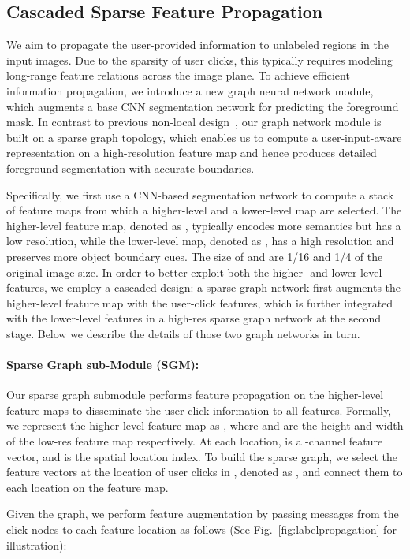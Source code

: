 \documentclass{bmvc2k}
\begin{document}
\subsection{Cascaded Sparse Feature Propagation}\label{prop}
We aim to propagate the user-provided information to unlabeled regions in the input images. Due to the sparsity of user clicks, this typically requires modeling long-range feature relations across the image plane. To achieve efficient information propagation, we introduce a new graph neural network module, which augments a base CNN segmentation network for predicting the foreground mask. In contrast to previous non-local design~\cite{wang2018non,chen2021conditional}, our graph network module is built on a sparse graph topology, which enables us to compute a user-input-aware representation on a high-resolution feature map and hence produces detailed foreground segmentation with accurate boundaries.   


Specifically, we first use a CNN-based segmentation network to compute a stack of feature maps from which a higher-level and a lower-level map are selected. The higher-level feature map, denoted as , typically encodes more semantics but has a low resolution, while the lower-level map, denoted as , has a high resolution and preserves more object boundary cues. The size of  and  are 1/16 and 1/4 of the original image size. 
In order to better exploit both the higher- and lower-level features, we employ a cascaded design: a sparse graph network first augments the higher-level feature map with the user-click features, which is further integrated with the lower-level features in a high-res sparse graph network at the second stage. 
Below we describe the details of those two graph networks in turn.  

\paragraph{Sparse Graph sub-Module (SGM):} 
Our sparse graph submodule performs feature propagation on the higher-level feature maps to disseminate the user-click information to all features. 
Formally, we represent the higher-level feature map  as , where  and  are the height and width of the low-res feature map respectively. At each location,  is a -channel feature vector, and  is the spatial location index. 
To build the sparse graph, we select the feature vectors at the location of user clicks in , denoted as , and connect them to each location on the feature map.  

Given the graph, we perform feature augmentation by passing messages from the click nodes  to each feature location as follows (See Fig.~\ref{fig:labelpropagation} for illustration):
\end{document}
